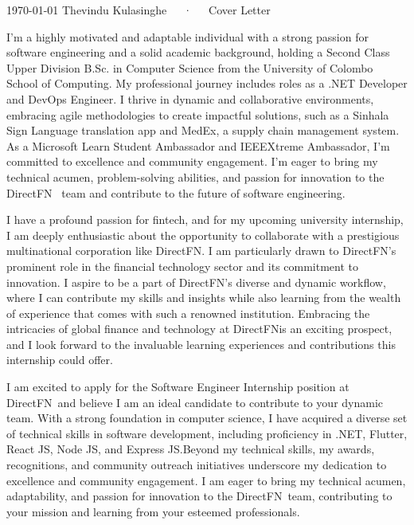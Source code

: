 \documentclass[11pt, a4paper]{awesome-cv}
\newcommand{\CompanyName}{DirectFN}
\begin{document}
\makecvheader[R]

\makecvfooter
{\today}
{Thevindu Kulasinghe~~~·~~~Cover Letter}
{}

\makelettertitle

\begin{cvletter}

  I'm a highly motivated and adaptable individual with a strong passion for software engineering and a solid academic background, holding a Second Class Upper Division B.Sc. in Computer Science from the University of Colombo School of Computing. My professional journey includes roles as a .NET Developer and DevOps Engineer. I thrive in dynamic and collaborative environments, embracing agile methodologies to create impactful solutions, such as a Sinhala Sign Language translation app and MedEx, a supply chain management system. As a Microsoft Learn Student Ambassador and IEEEXtreme Ambassador, I'm committed to excellence and community engagement. I'm eager to bring my technical acumen, problem-solving abilities, and passion for innovation to the \CompanyName~ team and contribute to the future of software engineering.

  \lettersection{Why \CompanyName?}
  I have a profound passion for fintech, and for my upcoming university internship, I am deeply enthusiastic about the opportunity to collaborate with a prestigious multinational corporation like \CompanyName. I am particularly drawn to \CompanyName's prominent role in the financial technology sector and its commitment to innovation. I aspire to be a part of \CompanyName's diverse and dynamic workflow, where I can contribute my skills and insights while also learning from the wealth of experience that comes with such a renowned institution. Embracing the intricacies of global finance and technology at \CompanyName is an exciting prospect, and I look forward to the invaluable learning experiences and contributions this internship could offer.

  I am excited to apply for the Software Engineer Internship position at \CompanyName~and believe I am an ideal candidate to contribute to your dynamic team. With a strong foundation in computer science, I have acquired a diverse set of technical skills in software development, including proficiency in .NET, Flutter, React JS, Node JS, and Express JS.Beyond my technical skills, my awards, recognitions, and community outreach initiatives underscore my dedication to excellence and community engagement. I am eager to bring my technical acumen, adaptability, and passion for innovation to the \CompanyName~team, contributing to your mission and learning from your esteemed professionals.

\end{cvletter}


\makeletterclosing
\end{document}
